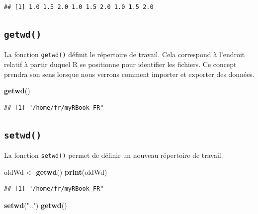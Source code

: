 \documentclass[twoside,symmetric]{book}
\newenvironment{Shaded}{}{}
\newcommand{\KeywordTok}[1]{\textbf{#1}}
\newcommand{\NormalTok}[1]{#1}
\newcommand{\StringTok}[1]{#1}
\begin{document}
\begin{verbatim}
## [1] 1.0 1.5 2.0 1.0 1.5 2.0 1.0 1.5 2.0
\end{verbatim}

\hypertarget{l015getwd}{%
\subsection{\texorpdfstring{\texttt{getwd()}}{getwd()}}\label{l015getwd}}

La fonction \texttt{getwd()} définit le répertoire de travail. Cela correspond à l'endroit relatif à partir duquel R se positionne pour identifier les fichiers. Ce concept prendra son sens lorsque nous verrons comment importer et exporter des données.

\begin{Shaded}
\begin{Highlighting}[]
\KeywordTok{getwd}\NormalTok{()}
\end{Highlighting}
\end{Shaded}

\begin{verbatim}
## [1] "/home/fr/myRBook_FR"
\end{verbatim}

\hypertarget{l015setwd}{%
\subsection{\texorpdfstring{\texttt{setwd()}}{setwd()}}\label{l015setwd}}

La fonction \texttt{setwd()} permet de définir un nouveau répertoire de travail.

\begin{Shaded}
\begin{Highlighting}[]
\NormalTok{oldWd <-}\StringTok{ }\KeywordTok{getwd}\NormalTok{()}
\KeywordTok{print}\NormalTok{(oldWd)}
\end{Highlighting}
\end{Shaded}

\begin{verbatim}
## [1] "/home/fr/myRBook_FR"
\end{verbatim}

\begin{Shaded}
\begin{Highlighting}[]
\KeywordTok{setwd}\NormalTok{(}\StringTok{".."}\NormalTok{)}
\KeywordTok{getwd}\NormalTok{()}
\end{Highlighting}
\end{Shaded}
\end{document}
